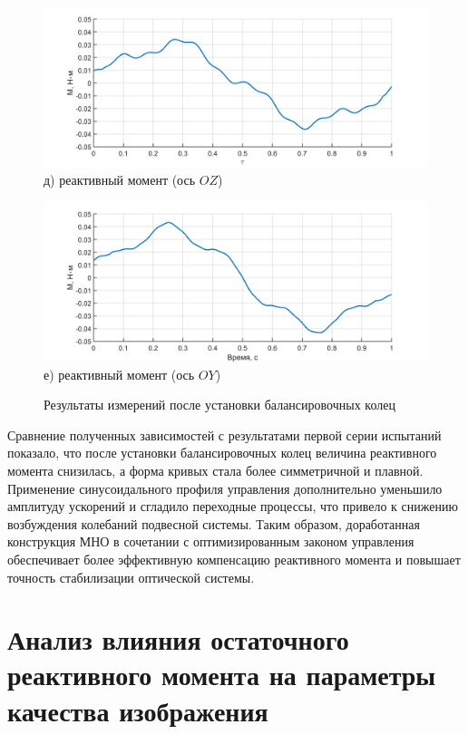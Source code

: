 \begin{figure}[h!]
	\begin{minipage}[b]{0.49\linewidth}\centering
	\includegraphics[width=\linewidth]{matlab/img/oz-gyro-sin-mom} \\ д) реактивный момент (ось $OZ$)
	\end{minipage}
	\hfill
	\begin{minipage}[b]{0.49\linewidth}\centering
		\includegraphics[width=\linewidth]{matlab/img/oy-gyro-sin-mom} \\ е)  реактивный момент (ось $OY$)
	\end{minipage}
	
	\caption{Результаты измерений после установки балансировочных колец}
	\label{fig:sin-profile-omn}
\end{figure}

Сравнение полученных зависимостей с результатами первой серии испытаний показало, что после установки балансировочных колец величина реактивного момента снизилась, а форма кривых стала более симметричной и плавной. Применение синусоидального профиля управления дополнительно уменьшило амплитуду ускорений и сгладило переходные процессы, что привело к снижению возбуждения колебаний подвесной системы. Таким образом, доработанная конструкция МНО в сочетании с оптимизированным законом управления обеспечивает более эффективную компенсацию реактивного момента и повышает точность стабилизации оптической системы.
 
 \section{Анализ влияния остаточного реактивного момента на параметры качества изображения}
 
